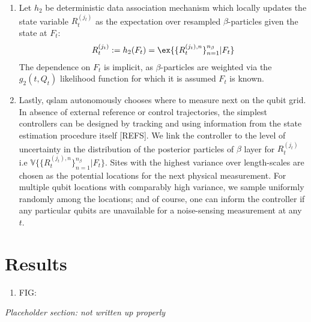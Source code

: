 \begin{enumerate}
\item Let $h_2$ be deterministic data association mechanism which locally updates the state variable $R_t^{(j_t)}$ as the expectation over resampled $\beta$-particles given the state at $F_t$:
\begin{align}
R_t^{(j_t)} := h_2(F_t) = \ex{\{R_t^{(j_t), n}\}_{n=1}^{n_\beta} | F_t}
\end{align} The dependence on $F_t$ is implicit, as $\beta$-particles are weighted via the $g_2(t, Q_t)$ likelihood function for which it is assumed $F_t$ is known.
\item Lastly, qslam autonomously chooses where to measure next on the qubit grid. In absence of external reference or control trajectories, the simplest controllers can be designed by tracking and using information from the state estimation procedure itself [REFS]. We link the controller to the level of uncertainty in the distribution of the posterior particles of  $\beta$ layer for $R_t^{(j_t)}$ i.e  $\mathbb{V}\{\{R_t^{(j_t), n}\}_{n=1}^{n_\beta} | F_t\}$. Sites with the highest variance over length-scales are chosen as the potential locations for the next physical measurement.  For multiple qubit locations with comparably high variance, we sample uniformly randomly among the locations; and of course, one can inform the controller if any particular qubits are unavailable for a noise-sensing measurement at any $t$. 
\end{enumerate}



























\iffalse
\section{Results} \label{sec:risk}
\begin{enumerate}
	\item FIG: 
\end{enumerate}

\textit{Placeholder section: not written up properly} \\

